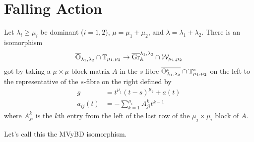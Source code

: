 \documentclass{article}
\begin{document}
\section{Falling Action} %

\begin{theorem}
    Let $\lambda_i\ge\mu_i$ be dominant ($i=1,2$), $\mu = \mu_1 +\mu_2$, and $\lambda =\lambda_1+\lambda_2$. 
    There is an isomorphism 
    \begin{equation}
        \overline{\mathbb O}_{\lambda_1,\lambda_2}\cap\mathbb T_{\mu_1,\mu_2} \to \overline{\operatorname{Gr}}_\mathbb A^{\lambda_1,\lambda_2}\cap \mathcal W_{\mu_1,\mu_2}
    \end{equation}
    got by taking a $\mu\times\mu$ block matrix $A$ in the $s$-fibre $\overline{\mathbb O_{\lambda_1,\lambda_2}^s}\cap\mathbb T_{\mu_1,\mu_2}^s$ on the left to the representative of the $s$-fibre on the right defined by  
    \begin{equation}
        \begin{split}
            g &= t^{\mu_1} (t-s)^{\mu_2} + a(t) \\
            a_{ij}(t) &= - \sum_{k=1}^{\mu_i} A^k_{ji} t^{k-1}
        \end{split}
    \end{equation}
    where $A^k_{ji}$ is the $k$th entry from the left of the last row of the $\mu_j\times\mu_i$ block of $A$. 
\end{theorem}

Let's call this the MVyBD isomorphism.
\end{document}
